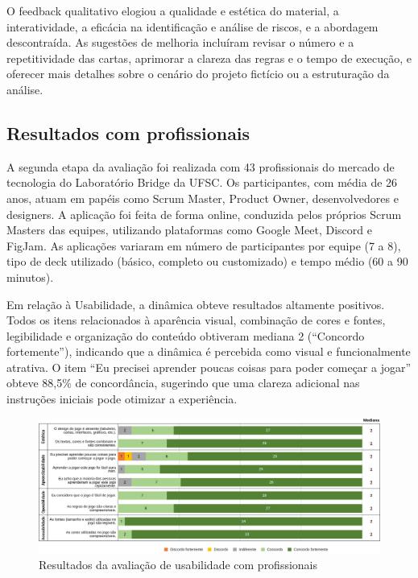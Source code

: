 \documentclass[12pt]{article}
\begin{document}
O feedback qualitativo elogiou a qualidade e estética do material, a interatividade, a eficácia na identificação e análise de riscos, e a abordagem descontraída. As sugestões de melhoria incluíram revisar o número e a repetitividade das cartas, aprimorar a clareza das regras e o tempo de execução, e oferecer mais detalhes sobre o cenário do projeto fictício ou a estruturação da análise.

\subsection{Resultados com profissionais}
A segunda etapa da avaliação foi realizada com 43 profissionais do mercado de tecnologia do Laboratório Bridge da UFSC. Os participantes, com média de 26 anos, atuam em papéis como Scrum Master, Product Owner, desenvolvedores e designers. A aplicação foi feita de forma online, conduzida pelos próprios Scrum Masters das equipes, utilizando plataformas como Google Meet, Discord e FigJam. As aplicações variaram em número de participantes por equipe (7 a 8), tipo de deck utilizado (básico, completo ou customizado) e tempo médio (60 a 90 minutos).

Em relação à Usabilidade, a dinâmica obteve resultados altamente positivos. Todos os itens relacionados à aparência visual, combinação de cores e fontes, legibilidade e organização do conteúdo obtiveram mediana 2 (“Concordo fortemente”), indicando que a dinâmica é percebida como visual e funcionalmente atrativa. O item “Eu precisei aprender poucas coisas para poder começar a jogar” obteve 88,5\% de concordância, sugerindo que uma clareza adicional nas instruções iniciais pode otimizar a experiência.

\begin{figure}[H]
	\caption{\label{bridge-usabilidade} Resultados da avaliação de usabilidade com profissionais}
  \includegraphics[width=\textwidth]{bridge-usabilidade}
\end{figure}
\end{document}

